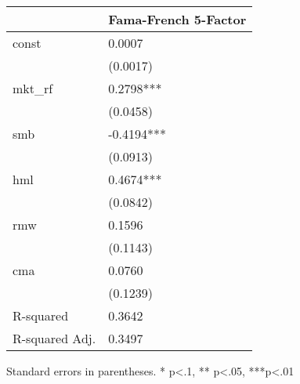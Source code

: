 \begin{table}
\caption{}
\label{}
\begin{center}
\begin{tabular}{ll}
\hline
               & Fama-French 5-Factor  \\
\hline
const          & 0.0007                \\
               & (0.0017)              \\
mkt\_rf        & 0.2798***             \\
               & (0.0458)              \\
smb            & -0.4194***            \\
               & (0.0913)              \\
hml            & 0.4674***             \\
               & (0.0842)              \\
rmw            & 0.1596                \\
               & (0.1143)              \\
cma            & 0.0760                \\
               & (0.1239)              \\
R-squared      & 0.3642                \\
R-squared Adj. & 0.3497                \\
\hline
\end{tabular}
\end{center}
\end{table}
\bigskip
Standard errors in parentheses. \newline 
* p<.1, ** p<.05, ***p<.01